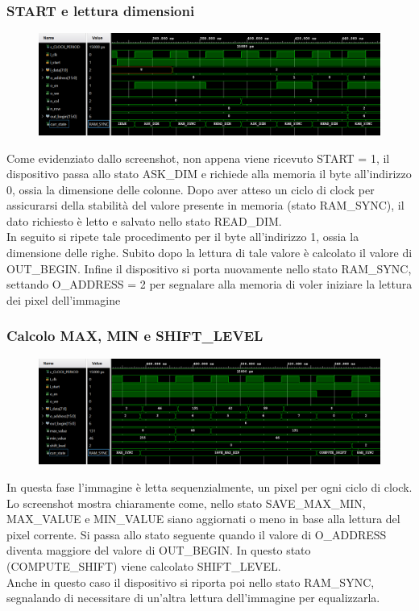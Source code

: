 \documentclass[a4paper, 12pt]{article}
\begin{document}
\subsubsection*{START e lettura dimensioni}
\begin{figure}[h]
    \centering
    \includegraphics[trim=0cm 1.25cm 0cm 0.25cm, width=1.0\textwidth]{simulazioni/2x2_SRD.png}
    \label{fig:2x2_SRD}
\end{figure}
Come evidenziato dallo screenshot, non appena viene ricevuto START = 1, il dispositivo passa allo stato ASK\_DIM e richiede alla memoria il byte all'indirizzo 0, ossia la dimensione delle colonne. 
Dopo aver atteso un ciclo di clock per assicurarsi della stabilità del valore presente in memoria (stato RAM\_SYNC), il dato richiesto è letto e salvato nello stato READ\_DIM. \\
In seguito si ripete tale procedimento per il byte all'indirizzo 1, ossia la dimensione delle righe.
Subito dopo la lettura di tale valore è calcolato il valore di OUT\_BEGIN. 
Infine il dispositivo si porta nuovamente nello stato RAM\_SYNC, settando O\_ADDRESS = 2 per segnalare alla memoria di voler iniziare la lettura dei pixel dell'immagine

\subsubsection*{Calcolo MAX, MIN e SHIFT\_LEVEL}
\begin{figure}[h]
    \centering
    \includegraphics[trim=0cm 1.25cm 0cm 0.25cm, width=1\textwidth]{simulazioni/2x2_MMSL.png}
    \label{fig:2x2_MMSL}
\end{figure}
In questa fase l'immagine è letta sequenzialmente, un pixel per ogni ciclo di clock. \\
Lo screenshot mostra chiaramente come, nello stato SAVE\_MAX\_MIN, MAX\_VALUE e MIN\_VALUE siano aggiornati o meno in base alla lettura del pixel corrente. Si passa allo stato seguente  quando il valore di O\_ADDRESS diventa maggiore del valore di OUT\_BEGIN. In questo stato (COMPUTE\_SHIFT) viene calcolato SHIFT\_LEVEL. \\
Anche in questo caso il dispositivo si riporta poi nello stato RAM\_SYNC, segnalando di necessitare di un'altra lettura dell'immagine per equalizzarla.
\end{document}
